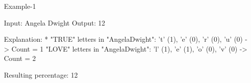 Example-1

​Input: Angela Dwight
​Output: 12

​Explanation: * "TRUE" letters in "AngelaDwight": 't' (1), 'e' (0), 'r' (0), 'u' (0) -> Count = 1
​"LOVE" letters in "AngelaDwight": 'l' (1), 'e' (1), 'o' (0), 'v' (0) -> Count = 2

​Resulting percentage: 12%